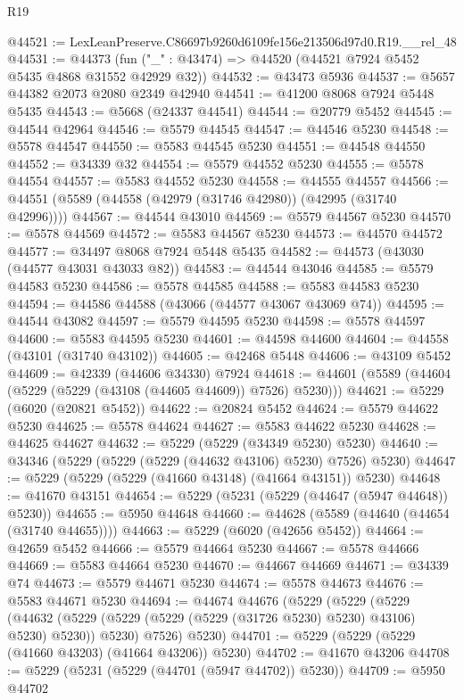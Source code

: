 \begin{lexlean}{R19}
\begin{coremodule}
@44521 := LexLeanPreserve.C86697b9260d6109fe156e213506d97d0.R19.__rel_48
@44531 := @44373 (fun ("_" : @43474) => @44520 (@44521 @7924 @5452 @5435 @4868 @31552 @42929 @32))
@44532 := @43473 @5936
@44537 := @5657 @44382 @2073 @2080 @2349 @42940
@44541 := @41200 @8068 @7924 @5448 @5435
@44543 := @5668 (@24337 @44541)
@44544 := @20779 @5452
@44545 := @44544 @42964
@44546 := @5579 @44545
@44547 := @44546 @5230
@44548 := @5578 @44547
@44550 := @5583 @44545 @5230
@44551 := @44548 @44550
@44552 := @34339 @32
@44554 := @5579 @44552 @5230
@44555 := @5578 @44554
@44557 := @5583 @44552 @5230
@44558 := @44555 @44557
@44566 := @44551 (@5589 (@44558 (@42979 (@31746 @42980)) (@42995 (@31740 @42996))))
@44567 := @44544 @43010
@44569 := @5579 @44567 @5230
@44570 := @5578 @44569
@44572 := @5583 @44567 @5230
@44573 := @44570 @44572
@44577 := @34497 @8068 @7924 @5448 @5435
@44582 := @44573 (@43030 (@44577 @43031 @43033 @82))
@44583 := @44544 @43046
@44585 := @5579 @44583 @5230
@44586 := @5578 @44585
@44588 := @5583 @44583 @5230
@44594 := @44586 @44588 (@43066 (@44577 @43067 @43069 @74))
@44595 := @44544 @43082
@44597 := @5579 @44595 @5230
@44598 := @5578 @44597
@44600 := @5583 @44595 @5230
@44601 := @44598 @44600
@44604 := @44558 (@43101 (@31740 @43102))
@44605 := @42468 @5448
@44606 := @43109 @5452
@44609 := @42339 (@44606 @34330) @7924
@44618 := @44601 (@5589 (@44604 (@5229 (@5229 (@43108 (@44605 @44609)) @7526) @5230)))
@44621 := @5229 (@6020 (@20821 @5452))
@44622 := @20824 @5452
@44624 := @5579 @44622 @5230
@44625 := @5578 @44624
@44627 := @5583 @44622 @5230
@44628 := @44625 @44627
@44632 := @5229 (@5229 (@34349 @5230) @5230)
@44640 := @34346 (@5229 (@5229 (@5229 (@44632 @43106) @5230) @7526) @5230)
@44647 := @5229 (@5229 (@5229 (@41660 @43148) (@41664 @43151)) @5230)
@44648 := @41670 @43151
@44654 := @5229 (@5231 (@5229 (@44647 (@5947 @44648)) @5230))
@44655 := @5950 @44648
@44660 := @44628 (@5589 (@44640 (@44654 (@31740 @44655))))
@44663 := @5229 (@6020 (@42656 @5452))
@44664 := @42659 @5452
@44666 := @5579 @44664 @5230
@44667 := @5578 @44666
@44669 := @5583 @44664 @5230
@44670 := @44667 @44669
@44671 := @34339 @74
@44673 := @5579 @44671 @5230
@44674 := @5578 @44673
@44676 := @5583 @44671 @5230
@44694 := @44674
    @44676
    (@5229
      (@5229
        (@5229
          (@44632 (@5229 (@5229 (@5229 (@5229 (@31726 @5230) @5230) @43106) @5230) @5230))
          @5230)
        @7526)
      @5230)
@44701 := @5229 (@5229 (@5229 (@41660 @43203) (@41664 @43206)) @5230)
@44702 := @41670 @43206
@44708 := @5229 (@5231 (@5229 (@44701 (@5947 @44702)) @5230))
@44709 := @5950 @44702

\end{coremodule}
\end{lexlean}
